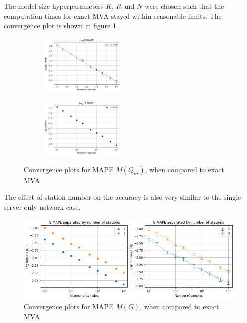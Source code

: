 The model size hyperparameters \(K\), \(R\) and \(N\) were chosen such that the computation times for exact MVA stayed within reasonable limits. The convergence plot is shown in figure \ref{fig:Convergence_NC_multiserver}.

\begin{figure}[!htb]
\begin{center}
\begin{subfigure}
    \centering
    \includegraphics[width=0.45\textwidth]{Chap6_EvaluationAndAnalysis/multiserver/convergence_NC_MS.png}
\end{subfigure}
\begin{subfigure}
    \centering
    \includegraphics[width=0.45\textwidth]{Chap6_EvaluationAndAnalysis/multiserver/convergence_NC_MS_meanerr.png}
\end{subfigure}
\caption{ Convergence plots for MAPE \(\bar{M}(Q_{kr})\), when compared to exact MVA}
\label{fig:Convergence_NC_multiserver}
\end{center}
\end{figure}

The effect of station number on the accuracy is also very similar to the single-server only network case.

\begin{figure}[!htb]
\begin{center}
\includegraphics[width=\textwidth]{Chap6_EvaluationAndAnalysis/multiserver/convergence_NC_MS_meanerr_class_separated.png}
\caption{ Convergence plots for MAPE \(\bar{M}(G)\), when compared to exact MVA}
\label{fig:Convergence_NC_multiserver_class_separated}
\end{center}
\end{figure}


